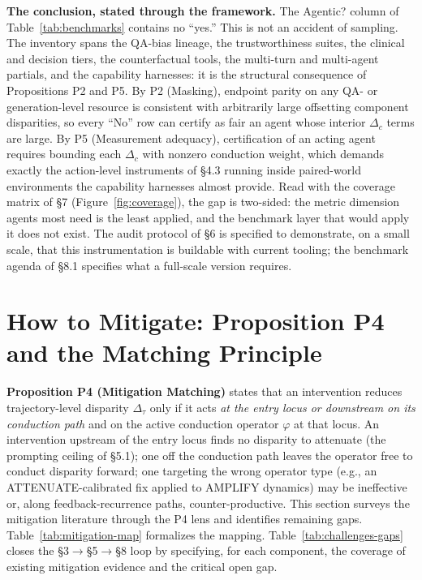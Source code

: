 \documentclass[acmsmall,nonacm]{acmart}
\begin{document}
\textbf{The conclusion, stated through the framework.} The Agentic? column of Table~\ref{tab:benchmarks} contains no ``yes.'' This is not an accident of sampling. The inventory spans the QA-bias lineage, the trustworthiness suites, the clinical and decision tiers, the counterfactual tools, the multi-turn and multi-agent partials, and the capability harnesses: it is the structural consequence of Propositions P2 and P5. By P2 (Masking), endpoint parity on any QA- or generation-level resource is consistent with arbitrarily large offsetting component disparities, so every ``No'' row can certify as fair an agent whose interior $\Delta_c$ terms are large. By P5 (Measurement adequacy), certification of an acting agent requires bounding each $\Delta_c$ with nonzero conduction weight, which demands exactly the action-level instruments of \S{}4.3 running inside paired-world environments the capability harnesses almost provide. Read with the coverage matrix of \S{}7 (Figure~\ref{fig:coverage}), the gap is two-sided: the metric dimension agents most need is the least applied, and the benchmark layer that would apply it does not exist. The audit protocol of \S{}6 is specified to demonstrate, on a small scale, that this instrumentation is buildable with current tooling; the benchmark agenda of \S{}8.1 specifies what a full-scale version requires.

\section{How to Mitigate: Proposition P4 and the Matching Principle}

\textbf{Proposition P4 (Mitigation Matching)} states that an intervention reduces trajectory-level disparity $\Delta_\tau$ only if it acts \emph{at the entry locus or downstream on its conduction path} and on the active conduction operator $\varphi$ at that locus. An intervention upstream of the entry locus finds no disparity to attenuate (the prompting ceiling of \S{}5.1); one off the conduction path leaves the operator free to conduct disparity forward; one targeting the wrong operator type (e.g., an ATTENUATE-calibrated fix applied to AMPLIFY dynamics) may be ineffective or, along feedback-recurrence paths, counter-productive. This section surveys the mitigation literature through the P4 lens and identifies remaining gaps. Table~\ref{tab:mitigation-map} formalizes the mapping. Table~\ref{tab:challenges-gaps} closes the \S{}3$\rightarrow$\S{}5$\rightarrow$\S{}8 loop by specifying, for each component, the coverage of existing mitigation evidence and the critical open gap.
\end{document}
